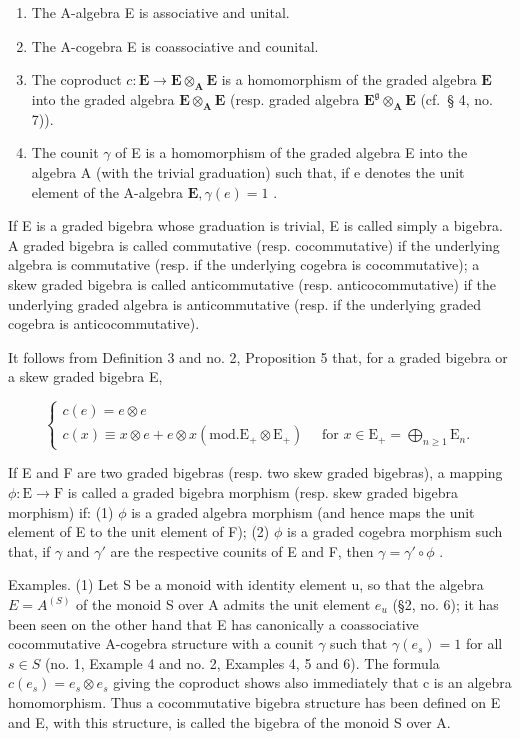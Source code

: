 \begin{enumerate}
\def\labelenumi{(\arabic{enumi})}
\item
  The A-algebra E is associative and unital.
\item
  The A-cogebra E is coassociative and counital.
\item
  The coproduct \(c: \mathbf{E} \to \mathbf{E} \otimes_{\mathbf{A}} \mathbf{E}\) is a homomorphism of the graded algebra \(\mathbf{E}\) into the graded algebra \(\mathbf{E} \otimes_{\mathbf{A}} \mathbf{E}\) (resp. graded algebra \(\mathbf{E}^{\mathfrak{g}} \otimes_{\mathbf{A}} \mathbf{E}\) (cf.~§ 4, no. 7)).
\item
  The counit \(\gamma\) of E is a homomorphism of the graded algebra E into the algebra A (with the trivial graduation) such that, if e denotes the unit element of the A-algebra \(\mathbf{E}, \gamma(e) = 1\) .
\end{enumerate}

If E is a graded bigebra whose graduation is trivial, E is called simply a bigebra. A graded bigebra is called commutative (resp. cocommutative) if the underlying algebra is commutative (resp. if the underlying cogebra is cocommutative); a skew graded bigebra is called anticommutative (resp. anticocommutative) if the underlying graded algebra is anticommutative (resp. if the underlying graded cogebra is anticocommutative).

It follows from Definition 3 and no. 2, Proposition 5 that, for a graded bigebra or a skew graded bigebra E,

\[
\left\{ \begin{array}{c} c (e) = e \otimes e \\ c (x) \equiv x \otimes e + e \otimes x (\mathrm{mod.} \mathrm{E} _ {+} \otimes \mathrm{E} _ {+}) \quad \text { for } x \in \mathrm{E} _ {+} = \bigoplus_ {n \geqslant 1} \mathrm{E} _ {n}. \end{array} \right.\tag{22}
\]

If E and F are two graded bigebras (resp. two skew graded bigebras), a mapping \(\phi: \mathrm{E} \to \mathrm{F}\) is called a graded bigebra morphism (resp. skew graded bigebra morphism) if: (1) \(\phi\) is a graded algebra morphism (and hence maps the unit element of E to the unit element of F); (2) \(\phi\) is a graded cogebra morphism such that, if \(\gamma\) and \(\gamma'\) are the respective counits of E and F, then \(\gamma = \gamma' \circ \phi\) .

Examples. (1) Let S be a monoid with identity element u, so that the algebra \(E = A^{(S)}\) of the monoid S over A admits the unit element \(e_{u}\) (§2, no. 6); it has been seen on the other hand that E has canonically a coassociative cocommutative A-cogebra structure with a counit \(\gamma\) such that \(\gamma(e_{s}) = 1\) for all \(s \in S\) (no. 1, Example 4 and no. 2, Examples 4, 5 and 6). The formula \(c(e_{s}) = e_{s} \otimes e_{s}\) giving the coproduct shows also immediately that c is an algebra homomorphism. Thus a cocommutative bigebra structure has been defined on E and E, with this structure, is called the bigebra of the monoid S over A.

